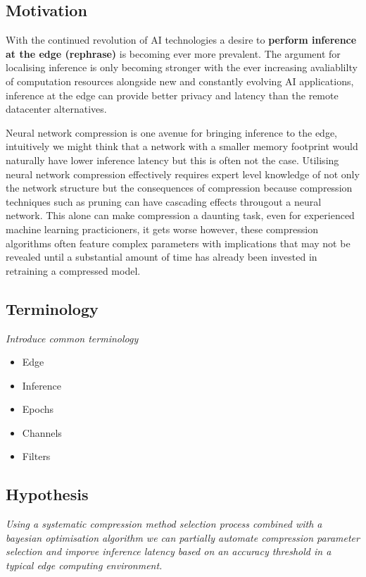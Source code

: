 \documentclass[../Dissertation.tex]{subfiles}
\begin{document}
\subsection{Motivation}
With the continued revolution of AI technologies a desire to \textbf{perform inference at the edge (rephrase)} is becoming ever more prevalent.
The argument for localising inference is only becoming stronger with the ever increasing avaliablilty of computation resources alongside new and constantly evolving AI applications, inference at the edge can provide better privacy and latency than the remote datacenter alternatives.


Neural network compression is one avenue for bringing inference to the edge, intuitively we might think that a network with a smaller memory footprint would naturally have lower inference latency but this is often not the case.
Utilising neural network compression effectively requires expert level knowledge of not only the network structure but the consequences of compression because compression techniques such as pruning can have cascading effects througout a neural network.
This alone can make compression a daunting task, even for experienced machine learning practicioners, it gets worse however, these compression algorithms often feature complex parameters with implications that may not be revealed until a substantial amount of time has already been invested in retraining a compressed model.

\subsection{Terminology}
\emph{Introduce common terminology}


\begin{itemize}
    \item Edge
    \item Inference
    \item Epochs
    \item Channels
    \item Filters
\end{itemize}

\subsection{Hypothesis}
\emph{Using a systematic compression method selection process combined with a bayesian optimisation algorithm we can partially automate compression parameter selection and imporve inference latency based on an accuracy threshold in a typical edge computing environment.}
\end{document}
